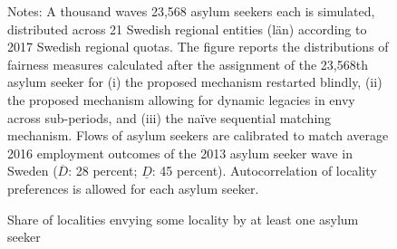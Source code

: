 \documentclass[12pt,fleqn]{article}
\begin{document}
\begin{figure}
	\caption{Share of localities envying some locality by at least one asylum seeker \label{FIG:quotas_fair0}}
	\begin{center}
	\end{center}
		{\scriptsize \vspace{-1em}
	\begin{singlespace}
		{\sc Notes:} A thousand waves 23,568 asylum seekers each is simulated, distributed across 21 Swedish regional entities (l\"{a}n) according to 2017 Swedish regional quotas. The figure reports the distributions of fairness measures calculated after the assignment of the 23,568th asylum seeker for (i) the proposed mechanism restarted blindly, (ii) the proposed mechanism allowing for dynamic legacies in envy across sub-periods, and (iii) the na\"{i}ve sequential matching mechanism. Flows of asylum seekers are calibrated to match average 2016 employment outcomes of the 2013 asylum seeker wave in Sweden ($\overline{D}$: 28 percent; $\underline{D}$: 45 percent). Autocorrelation of locality preferences is allowed for each asylum seeker.
	\end{singlespace}
	 }
\end{figure}
\end{document}
